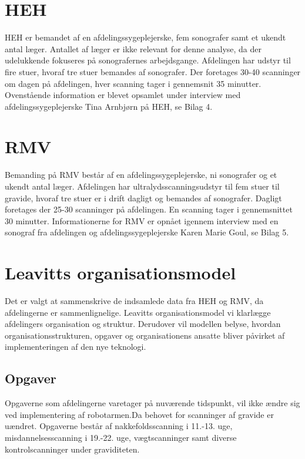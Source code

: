 \section{HEH}
HEH er bemandet af en afdelingssygeplejerske, fem sonografer samt et ukendt antal læger. Antallet af læger er ikke relevant for denne analyse, da der udelukkende fokuseres på sonografernes arbejdsgange.
Afdelingen har udstyr til fire stuer, hvoraf tre stuer bemandes af sonografer. Der foretages 30-40 scanninger om dagen på afdelingen, hver scanning tager i gennemsnit 35 minutter. 
Ovenstående information er blevet opsamlet under interview med afdelingssygeplejerske Tina Arnbjørn på HEH, se Bilag 4.

\section{RMV}
Bemanding på RMV består af en afdelingssygeplejerske, ni sonografer og et ukendt antal læger. Afdelingen har ultralydsscanningsudstyr til fem stuer til gravide, hvoraf tre stuer er i drift dagligt og bemandes af sonografer. Dagligt foretages der 25-30 scanninger på afdelingen. En scanning tager i gennemsnittet 30 minutter.
Informationerne for RMV er opnået igennem interview med en sonograf fra afdelingen og afdelingssygeplejerske Karen Marie Goul, se Bilag 5.

\section{Leavitts organisationsmodel}
Det er valgt at sammenskrive de indsamlede data fra HEH og RMV, da afdelingerne er sammenlignelige. Leavitts organisationsmodel vi klarlægge afdelingers organisation og struktur. Derudover vil modellen belyse, hvordan organisationsstrukturen, opgaver og organisationens ansatte bliver påvirket af implementeringen af den nye teknologi. \cite{Leavitt} \cite{diamantmodel} 


\subsection{Opgaver}
Opgaverne som afdelingerne varetager på nuværende tidspunkt, vil ikke ændre sig ved implementering af robotarmen.Da behovet for scanninger af gravide er uændret. Opgaverne består af nakkefoldsscanning i 11.-13. uge, misdannelsesscanning i 19.-22. uge, vægtscanninger samt diverse kontrolscanninger under graviditeten. \cite{graviditet} 

